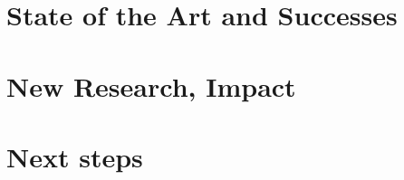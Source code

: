 \documentclass[11pt]{article}
\newcommand\ASGNMT[1]{}%
\begin{document}





\section{State of the Art and Successes\ASGNMT{Ignacio (lead), Ganesh, Koushik}}
\label{sec:state-of-the-art-successes}


\section{New Research, Impact\ASGNMT{Sriram (lead)}}
\label{sec:new-research-impact}




\section{Next steps\ASGNMT{Richard (Lead), Sriram, Steve, Koushik, Paul, Ganesh}}
\label{sec:specific-recommendations}


%
 
\end{document}
